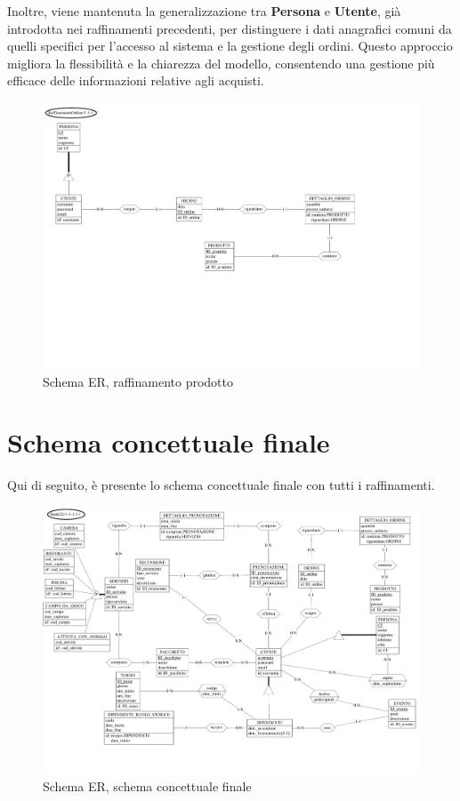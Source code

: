 \documentclass[a4paper,12pt]{report}
\begin{document}
\vspace{\baselineskip}
Inoltre, viene mantenuta la generalizzazione tra \textbf{Persona} e \textbf{Utente}, già introdotta nei raffinamenti
precedenti, per distinguere i dati anagrafici comuni da quelli specifici per l'accesso al sistema e la gestione degli
ordini. Questo approccio migliora la flessibilità e la chiarezza del modello, consentendo una gestione più efficace
delle informazioni relative agli acquisti.

\begin{figure}[H]
	\centering
	\includegraphics[width=\textwidth, trim=0 200pt 125pt 0, clip]{./pdf/raffinamento prodotto.pdf}
	\caption{Schema ER, raffinamento prodotto}
	\label{fig:raffinamento-prodotto}
\end{figure}

\newpage
\section{Schema concettuale finale}
Qui di seguito, è presente lo schema concettuale finale con tutti i raffinamenti.

\begin{figure}[H]
	\centering
	\includegraphics[width=\textwidth, trim=0 50pt 0 0, clip, angle=0]{./pdf/finale.pdf}
	\caption{Schema ER, schema concettuale finale}
	\label{fig:schema-finale}
\end{figure}
\newpage
\end{document}
